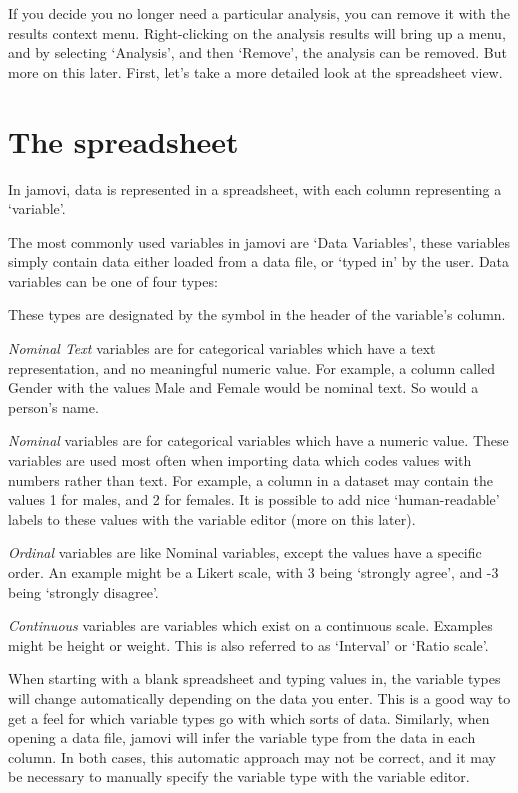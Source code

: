 If you decide you no longer need a particular analysis, you can remove it with the results context menu. Right-clicking on the analysis results will bring up a menu, and by selecting ‘Analysis’, and then ‘Remove’, the analysis can be removed. But more on this later. First, let's take a more detailed look at the spreadsheet view.


\section{The spreadsheet\label{sec:spreadsheet}}

In jamovi, data is represented in a spreadsheet, with each column representing a ‘variable’.


The most commonly used variables in jamovi are ‘Data Variables’, these variables simply contain data either loaded from a data file, or ‘typed in’ by the user. Data variables can be one of four types:

\begin{figure}[h]
\end{figure}

These types are designated by the symbol in the header of the variable’s column.

{\it Nominal Text} variables are for categorical variables which have a text representation, and no meaningful numeric value. For example, a column called Gender with the values Male and Female would be nominal text. So would a person’s name.

{\it Nominal} variables are for categorical variables which have a numeric value. These variables are used most often when importing data which codes values with numbers rather than text. For example, a column in a dataset may contain the values 1 for males, and 2 for females. It is possible to add nice ‘human-readable’ labels to these values with the variable editor (more on this later).

{\it Ordinal} variables are like Nominal variables, except the values have a specific order. An example might be a Likert scale, with 3 being ‘strongly agree’, and -3 being ‘strongly disagree’.

{\it Continuous} variables are variables which exist on a continuous scale. Examples might be height or weight. This is also referred to as ‘Interval’ or ‘Ratio scale’.

When starting with a blank spreadsheet and typing values in, the variable types will change automatically depending on the data you enter. This is a good way to get a feel for which variable types go with which sorts of data. Similarly, when opening a data file, jamovi will infer the variable type from the data in each column. In both cases, this automatic approach may not be correct, and it may be necessary to manually specify the variable type with the variable editor.

